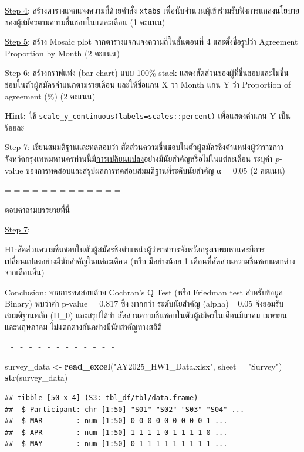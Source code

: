 \documentclass[
]{article}
\newenvironment{Shaded}{\begin{snugshade}}{\end{snugshade}}
\newcommand{\AttributeTok}[1]{\textcolor[rgb]{0.13,0.29,0.53}{#1}}
\newcommand{\FunctionTok}[1]{\textcolor[rgb]{0.13,0.29,0.53}{\textbf{#1}}}
\newcommand{\NormalTok}[1]{#1}
\newcommand{\OtherTok}[1]{\textcolor[rgb]{0.56,0.35,0.01}{#1}}
\newcommand{\StringTok}[1]{\textcolor[rgb]{0.31,0.60,0.02}{#1}}
\begin{document}
\ul{Step 4}: สร้างตารางแจกแจงความถี่ด้วยคำสั่ง \texttt{xtabs}
เพื่อนับจำนวนผู้เข้าร่วมรับฟังการแถลงนโยบายของผู้สมัครตามความชื่นชอบในแต่ละเดือน (1
คะแนน)

\ul{Step 5}: สร้าง Mosaic plot จากตารางแจกแจงความถี่ในขั้นตอนที่ 4 และตั้งชื่อรูปว่า
Agreement Proportion by Month (2 คะแนน)

\ul{Step 6}: สร้างกราฟแท่ง (bar chart) แบบ 100\% stack
แสดงสัดส่วนของผู้ที่ชื่นชอบและไม่ชื่นชอบในตัวผู้สมัครจำแนกตามรายเดือน และให้ชื่อแกน X ว่า
Month แกน Y ว่า Proportion of agreement (\%) (2 คะแนน)

\textbf{Hint:} ใช้ \texttt{scale\_y\_continuous(labels=scales::percent)}
เพื่อแสดงค่าแกน Y เป็นร้อยละ

\ul{Step 7}: เขียนสมมติฐานและทดสอบว่า
สัดส่วนความชื่นชอบในตัวผู้สมัครชิงตำแหน่งผู้ว่าราชการจังหวัดกรุงเทพมหานครท่านนี้มี\ul{การเปลี่ยนแปลง}อย่างมีนัยสำคัญหรือไม่ในแต่ละเดือน
ระบุค่า \emph{p}-value ของการทดสอบและสรุปผลการทดสอบสมมติฐานที่ระดับนัยสำคัญ α =
0.05 (2 คะแนน)

=-=-=-=-=-=-=-=-=-=-=-=-=

ตอบคำถามบรรยายที่นี่

\ul{Step 7}:

H1:สัดส่วนความชื่นชอบในตัวผู้สมัครชิงตำแหน่งผู้ว่าราชการจังหวัดกรุงเทพมหานครมีการเปลี่ยนแปลงอย่างมีนัยสำคัญในแต่ละเดือน
(หรือ มีอย่างน้อย 1 เดือนที่สัดส่วนความชื่นชอบแตกต่างจากเดือนอื่น)

Conclusion: จากการทดสอบด้วย Cochran's Q Test (หรือ Friedman test สำหรับข้อมูล
Binary) พบว่าค่า p-value = 0.817 ซึ่ง มากกว่า ระดับนัยสำคัญ (alpha)= 0.05
จึงยอมรับ สมมติฐานหลัก (H\_0) และสรุปได้ว่า สัดส่วนความชื่นชอบในตัวผู้สมัครในเดือนมีนาคม
เมษายน และพฤษภาคม ไม่แตกต่างกันอย่างมีนัยสำคัญทางสถิติ

=-=-=-=-=-=-=-=-=-=-=-=-=

\begin{Shaded}
\begin{Highlighting}[]
\NormalTok{survey\_data }\OtherTok{\textless{}{-}} \FunctionTok{read\_excel}\NormalTok{(}\StringTok{"AY2025\_HW1\_Data.xlsx"}\NormalTok{, }\AttributeTok{sheet =} \StringTok{"Survey"}\NormalTok{)}
\FunctionTok{str}\NormalTok{(survey\_data)}
\end{Highlighting}
\end{Shaded}

\begin{verbatim}
## tibble [50 x 4] (S3: tbl_df/tbl/data.frame)
##  $ Participant: chr [1:50] "S01" "S02" "S03" "S04" ...
##  $ MAR        : num [1:50] 0 0 0 0 0 0 0 0 0 1 ...
##  $ APR        : num [1:50] 1 1 1 1 0 1 1 1 1 0 ...
##  $ MAY        : num [1:50] 0 1 1 1 1 1 1 1 1 1 ...
\end{verbatim}
\end{document}
